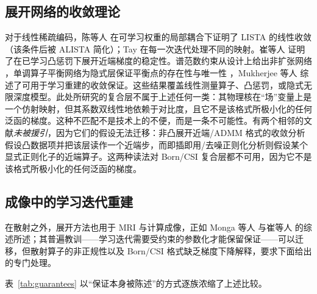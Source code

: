 \documentclass[UTF8,a4paper,11pt]{ctexart}
\begin{document}
\subsection{展开网络的收敛理论}
对于线性稀疏编码，陈等人 \cite{listacp} 在可学习权重的局部耦合下证明了 LISTA \cite{lista} 的线性收敛（该条件后被 ALISTA \cite{alista} 简化）；Tay \cite{algomapping} 在每一次迭代处理不同的映射。崔等人 \cite{cui_reg} 证明了在已学习凸惩罚下展开近端梯度的稳定性。谱范数约束从设计上给出非扩张网络 \cite{sherry_nonexp}，单调算子平衡网络为隐式层保证平衡点的存在性与唯一性 \cite{mondeq}，Mukherjee 等人 \cite{mukherjee2023} 综述了可用于学习重建的收敛保证。这些结果覆盖线性测量算子、凸惩罚，或隐式无限深度模型。此处所研究的复合层不属于上述任何一类：其物理核在“场”变量上是一个仿射映射，但其系数双线性地依赖于对比度，且它不是该格式所极小化的任何泛函的梯度。这种不匹配不是技术上的不便，而是一条不可能性。有两个相邻的文献\emph{未被援引}，因为它们的假设无法迁移：非凸展开近端/ADMM 格式的收敛分析假设凸数据项并把该层读作一个近端步，而即插即用/去噪正则化分析则假设某个显式正则化子的近端算子。这两种读法对 Born/CSI 复合层都不可用，因为它不是该格式所极小化的任何泛函的梯度。

\subsection{成像中的学习迭代重建}
在散射之外，展开方法也用于 MRI 与计算成像，正如 Monga 等人 \cite{monga_survey} 与崔等人 \cite{cui_reg} 的综述所述；其普遍教训——学习迭代需要受约束的参数化才能保留保证——可以迁移，但散射算子的非正规性以及 Born/CSI 格式缺乏梯度下降解释，要求下面给出的专门处理。

表~\ref{tab:guarantees} 以“保证本身被陈述”的方式逐族浓缩了上述比较。
\end{document}
